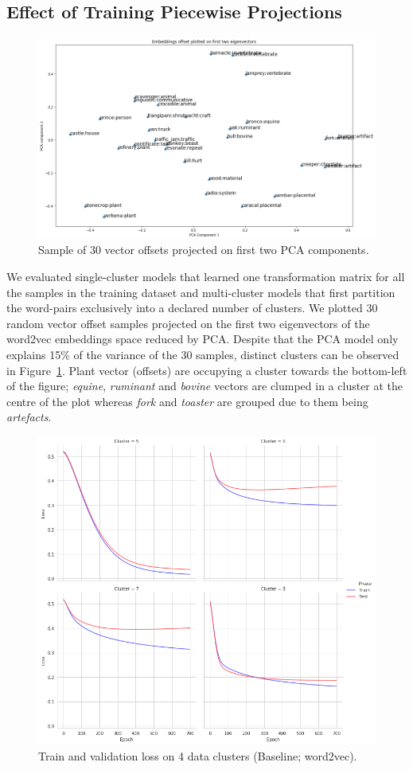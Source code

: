 \subsection{Effect of Training Piecewise Projections}
\begin{figure}[ht!] 
  \centering
  \includegraphics[width=0.75\linewidth]{images/Sample_of_30_vector_offsets_PCA.png}
  \caption{Sample of 30 vector offsets projected on first two PCA components.}
  \label{fig:cluster_30_samp_pca}
\end{figure}
We evaluated single-cluster models that learned one transformation matrix for all the samples in the training dataset and multi-cluster models that first partition the word-pairs exclusively into a declared number of clusters.  We plotted 30 random vector offset samples projected on the first two eigenvectors of the word2vec embeddings space reduced by \ac{PCA}.  Despite that the PCA model only explains 15\% of the variance of the 30 samples, distinct clusters can be observed in Figure~\ref{fig:cluster_30_samp_pca}.  Plant vector (offsets) are occupying a cluster towards the bottom-left of the figure; \textit{equine}, \textit{ruminant} and \textit{bovine} vectors are clumped in a cluster at the centre of the plot whereas \textit{fork} and \textit{toaster} are grouped due to them being \textit{artefacts}.

\begin{figure}[ht!] 
  \centering
  \includegraphics[width=0.6\linewidth]{images/Train_losses_4_clusters_baseline_w2v.png}
  \caption{Train and validation loss on 4 data clusters (Baseline; word2vec).}
  \label{fig:train_test_loss_w2v}
\end{figure}

